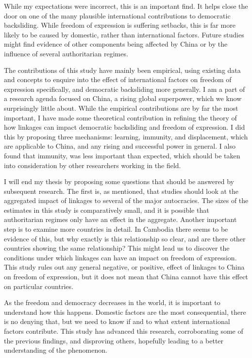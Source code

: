 While my expectations were incorrect, this is an important find. It helps close the door on one of the many plausible international contributions to democratic backsliding. While freedom of expression is suffering setbacks, this is far more likely to be caused by domestic, rather than international factors. Future studies might find evidence of other components being affected by China or by the influence of several authoritarian regimes. 

The contributions of this study have mainly been empirical, using existing data and concepts to enquire into the effect of international factors on freedom of expression specifically, and democratic backsliding more generally. I am a part of a research agenda focused on China, a rising global superpower, which we know surprisingly little about. While the empirical contributions are by far the most important, I have made some theoretical contribution in refining the theory of how linkages can impact democratic backsliding and freedom of expression. I did this by proposing three mechanisms: learning, immunity, and displacement, which are applicable to China, and any rising and successful power in general. I also found that immunity, was less important than expected, which should be taken into consideration by other researchers working in the field. 

I will end my thesis by proposing some questions that should be answered by subsequent research. The first is, as mentioned, that studies should look at the aggregated impact of linkages to several of the major autocracies. The sizes of the estimates in this study is comparatively small, and it is possible that authoritarian regimes only have an effect in the aggregate. Another important step is to examine more countries in detail. In Cambodia there seems to be evidence of this, but why exactly is this relationship so clear, and are there other countries showing the same relationship? This might lead us to discover the conditions under which linkages can have an impact on freedom of expression. This study rules out any general negative, or positive, effect of linkages to China on freedom of expression, but it does not mean that China cannot have this effect on particular countries.

As the freedom and democracy decreases in the world, it is important to understand how this happens. Domestic factors are the most consequential, there is no denying that, but we need to know if and to what extent international factors contribute. This study has advanced this research, corroborating some of the previous findings, and disproving others, hopefully leading to a better understanding of the phenomenon.